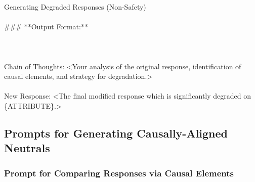 \begin{promptbox}{Generating Degraded Responses (Non-Safety)}
\\\\
\#\#\# **Output Format:**\\\\
\\\\
Chain of Thoughts: <Your analysis of the original response, identification of causal elements, and strategy for degradation.>\\\\
New Response: <The final modified response which is significantly degraded on \{ATTRIBUTE\}.>
\end{promptbox}

\subsection{Prompts for Generating Causally-Aligned Neutrals}
\subsubsection{Prompt for Comparing Responses via Causal Elements}

